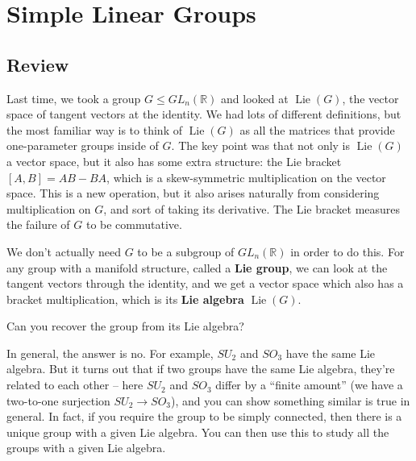 
\section{Simple Linear Groups}

\subsection{Review}

Last time, we took a group $G \leq GL_n(\mathbb{R})$ and looked at $\operatorname{Lie}(G)$, the vector space of tangent vectors at the identity. We had lots of different definitions, but the most familiar way is to think of $\operatorname{Lie}(G)$ as all the matrices that provide one-parameter groups inside of $G.$ The key point was that not only is $\operatorname{Lie}(G)$ a vector space, but it also has some extra structure: the Lie bracket $[A, B] = AB - BA$, which is a skew-symmetric multiplication on the vector space. This is a new operation, but it also arises naturally from considering multiplication on $G$, and sort of taking its derivative. The Lie bracket measures the failure of $G$ to be commutative.

We don't actually need $G$ to be a subgroup of $GL_n(\mathbb{R})$ in order to do this. For any group with a manifold structure, called a \textbf{Lie group}, we can look at the tangent vectors through the identity, and we get a vector space which also has a bracket multiplication, which is its \textbf{Lie algebra} $\operatorname{Lie}(G)$. 

\begin{question}
    Can you recover the group from its Lie algebra?
\end{question}

\begin{ans}
    In general, the answer is no. For example, $SU_2$ and $SO_3$ have the same Lie algebra. But it turns out that if two groups have the same Lie algebra, they're related to each other -- here $SU_2$ and $SO_3$ differ by a ``finite amount'' (we have a two-to-one surjection $SU_2 \to SO_3$), and you can show something similar is true in general. In fact, if you require the group to be simply connected, then there is a unique group with a given Lie algebra. You can then use this to study all the groups with a given Lie algebra. 
\end{ans}

